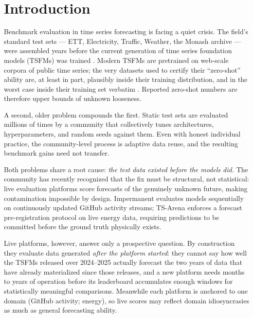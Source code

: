 \documentclass{article}
\begin{document}
\section{Introduction}

Benchmark evaluation in time series forecasting is facing a quiet crisis. The field's standard test sets --- ETT, Electricity, Traffic, Weather, the Monash archive \citep{godahewa2021monash} --- were assembled years before the current generation of time series foundation models (TSFMs) was trained \citep{ansari2024chronos,das2024timesfm,woo2024moirai,shi2025timemoe}. Modern TSFMs are pretrained on web-scale corpora of public time series; the very datasets used to certify their ``zero-shot'' ability are, at least in part, plausibly inside their training distribution, and in the worst case inside their training set verbatim \citep{meyer2025leakage}. Reported zero-shot numbers are therefore upper bounds of unknown looseness.

A second, older problem compounds the first. Static test sets are evaluated millions of times by a community that collectively tunes architectures, hyperparameters, and random seeds against them. Even with honest individual practice, the community-level process is adaptive data reuse, and the resulting benchmark gains need not transfer.

Both problems share a root cause: \emph{the test data existed before the models did.} The community has recently recognized that the fix must be structural, not statistical: live evaluation platforms score forecasts of the genuinely unknown future, making contamination impossible by design. Impermanent \citep{garza2026impermanent} evaluates models sequentially on continuously updated GitHub activity streams; TS-Arena \citep{meyer2026tsarena} enforces a forecast pre-registration protocol on live energy data, requiring predictions to be committed before the ground truth physically exists.

Live platforms, however, answer only a prospective question. By construction they evaluate data generated \emph{after the platform started}: they cannot say how well the TSFMs released over 2024--2025 actually forecast the two years of data that have already materialized since those releases, and a new platform needs months to years of operation before its leaderboard accumulates enough windows for statistically meaningful comparisons. Meanwhile each platform is anchored to one domain (GitHub activity; energy), so live scores may reflect domain idiosyncrasies as much as general forecasting ability.
\end{document}
